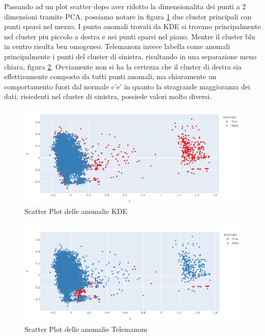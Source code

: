 Passando ad un plot scatter dopo aver ridotto la dimensionalita dei punti a 2 dimensioni tramite PCA, possiamo notare in figura \ref{kde_scatter} due cluster principali con punti sparsi nel mezzo. I punto anomali trovati da KDE si trovano principalmente nel cluster piu piccolo a destra e nei punti sparsi nel piano. Mentre il cluster blu in centro risulta ben omogeneo.
Telemanom invece labella come anomali principalmente i punti del cluster di sinistra, risultando in una separazione meno chiara, figura \ref{worst_clf_scatter}.
Ovviamente non si ha la certezza che il cluster di destra sia effettivamente composto da tutti punti anomali, ma chiaramente un comportamento fuori dal normale c'e' in quanto la stragrande maggioranza dei dati, risiedenti nel cluster di sinistra, possiede valori molto diversi.


\begin{figure}[t]
\centering
	\includegraphics[width=14cm, scale=1]{images/kde_scatter}
   \caption{Scatter Plot delle anomalie KDE}
	\label{kde_scatter}
	
\end{figure}




\begin{figure}[t]
\centering
	\includegraphics[width=14cm, scale=1]{images/worst_clf_scatter}
   \caption{Scatter Plot delle anomalie Telemanom}
	\label{worst_clf_scatter}
	
\end{figure}

